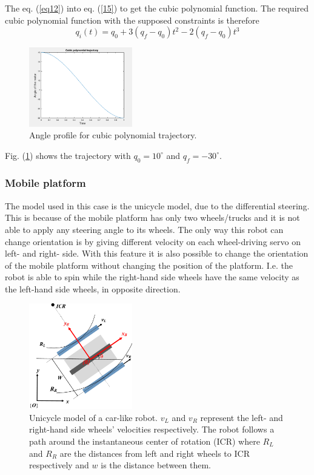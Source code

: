 The eq. (\ref{eq12}) into eq. (\ref{15}) to get the cubic polynomial function. The required cubic polynomial function with the supposed constraints is therefore
\begin{equation}
    q_i(t) = q_0 + 3(q_f - q_0)t^2 - 2(q_f - q_0)t^3
\end{equation}
\begin{figure}[H]
    \centering
    \includegraphics[width=0.4\textwidth]{sections/assets/cubic.png}
    \caption{Angle profile for cubic polynomial trajectory.}
    \label{fig2}
\end{figure}
Fig. (\ref{fig2}) shows the trajectory with $q_0 = 10^\circ$ and $q_f = -30^\circ$.


\subsubsection{Mobile platform}
\label{subsubsec:unicycle}
The model used in this case is the unicycle model, due to the differential steering.
This is because of the mobile platform has only two wheels/trucks and it is not able to apply any steering angle to its wheels.
The only way this robot can change orientation is by giving different velocity on each wheel-driving servo on left- and right- side.
With this feature it is also possible to change the orientation of the mobile platform without changing the position of the platform.
I.e. the robot is able to spin while the right-hand side wheels have the same velocity as the left-hand side wheels, in opposite direction.
\begin{figure}[h]
\centering
\includegraphics[width=0.4\textwidth]{sections/assets/car-unicycle.png}
\caption{Unicycle model of a car-like robot.
$v_L$ and $v_R$ represent the left- and right-hand side wheels' velocities respectively.
The robot follows a path around the instantaneous center of rotation (ICR) where $R_L$ and $R_R$ are the distances from left and right wheels to ICR respectively and $w$ is the distance between them.}
\label{fig:UnicycleModel}
\end{figure}

